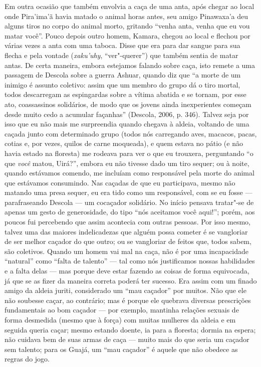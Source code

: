 Em outra ocasião que também envolvia a caça de uma anta, após chegar ao
local onde Pira'ima'ã havia matado o animal horas antes, seu amigo
Pinawaxa'a deu alguns tiros no corpo do animal morto, gritando ``venha
anta, venha que eu vou matar você''. Pouco depois outro homem, Kamara,
chegou ao local e flechou por várias vezes a anta com uma taboca. Disse
que era para dar sangue para sua flecha e pela vontade (\emph{xaku'uhy},
``ver"-querer'') que também sentia de matar antas. De certa maneira, embora
estejamos falando sobre caça, isto remete a uma passagem de Descola
sobre a guerra Ashuar, quando diz que ``a morte de um inimigo é assunto
coletivo: assim que um membro do grupo dá o tiro mortal, todos
descarregam as espingardas sobre a vítima abatida e se tornam, por esse
ato, coassassinos solidários, de modo que os jovens ainda inexperientes
começam desde muito cedo a acumular façanhas'' (Descola, 2006, p. 346).
Talvez seja por isso que eu não mais me surpreendia quando chegava à
aldeia, voltando de uma caçada junto com determinado grupo (todos nós
carregando aves, macacos, pacas, cotias e, por vezes, quilos de carne
moqueada), e quem estava no pátio (e não havia estado na floresta) me
rodeava para ver o que eu trouxera, perguntando ``o que \emph{você}
matou, Uirá?'', embora eu não tivesse dado um tiro sequer; ou à noite,
quando estávamos comendo, me incluíam como responsável pela morte do
animal que estávamos consumindo. Nas caçadas de que eu participava,
mesmo não matando uma presa sequer, eu era tido como um responsável, com
se eu fosse --- parafraseando Descola --- um cocaçador solidário. No início
pensava tratar"-se de apenas um gesto de generosidade, do tipo ``nós
aceitamos você aqui!''; porém, aos poucos fui percebendo que assim
acontecia com outras pessoas. Por isso mesmo, talvez uma das maiores
indelicadezas que alguém possa cometer é se vangloriar de ser melhor
caçador do que outro; ou se vangloriar de feitos que, todos sabem, são
coletivos. Quando um homem vai mal na caça, não é por uma incapacidade
``natural'' como ``falta de talento'' --- tal como nós justificamos nossas
habilidades e a falta delas --- mas porque deve estar fazendo as coisas de
forma equivocada, já que se as fizer da maneira correta poderá ter
sucesso. Era assim com um finado amigo da aldeia juriti, considerado um
``mau caçador'' por muitos. Não que ele não soubesse caçar, ao contrário;
mas é porque ele quebrava diversas prescrições fundamentais ao bom
caçador --- por exemplo, mantinha relações sexuais de forma desmedida
(mesmo que à força) com muitas mulheres da aldeia e em seguida queria
caçar; mesmo estando doente, ia para a floresta; dormia na espera; não
cuidava bem de suas armas de caça --- muito mais do que seria um caçador
sem talento; para os Guajá, um ``mau caçador'' é aquele que não obedece as
regras do jogo.

